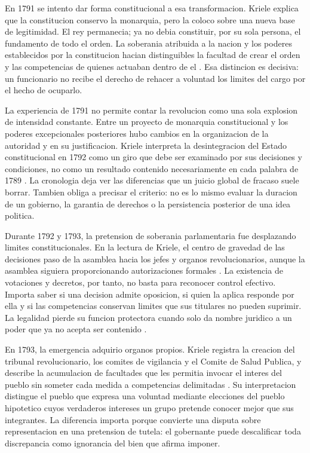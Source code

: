 \documentclass[spanish,letterpaper,oneside]{article}
\begin{document}
En 1791 se intento dar forma constitucional a esa transformacion.
Kriele explica que la constitucion conservo la monarquia, pero la
coloco sobre una nueva base de legitimidad. El rey permanecia; ya no
debia constituir, por su sola persona, el fundamento de todo el orden.
La soberania atribuida a la nacion y los poderes establecidos por la
constitucion hacian distinguibles la facultad de crear el orden y las
competencias de quienes actuaban dentro de el
\citep[secs.~68--69, pp.~266--272]{kriele2022}. Esa distincion es
decisiva: un funcionario no recibe el derecho de rehacer a voluntad
los limites del cargo por el hecho de ocuparlo.

La experiencia de 1791 no permite contar la revolucion como una sola
explosion de intensidad constante. Entre un proyecto de monarquia
constitucional y los poderes excepcionales posteriores hubo cambios
en la organizacion de la autoridad y en su justificacion. Kriele
interpreta la desintegracion del Estado constitucional en 1792 como
un giro que debe ser examinado por sus decisiones y condiciones,
no como un resultado contenido necesariamente en cada palabra de
1789 \citep[sec.~70, pp.~273--276]{kriele2022}. La cronologia deja
ver las diferencias que un juicio global de fracaso suele borrar.
Tambien obliga a precisar el criterio: no es lo mismo evaluar la
duracion de un gobierno, la garantia de derechos o la persistencia
posterior de una idea politica.

Durante 1792 y 1793, la pretension de soberania parlamentaria fue
desplazando limites constitucionales. En la lectura de Kriele, el
centro de gravedad de las decisiones paso de la asamblea hacia los
jefes y organos revolucionarios, aunque la asamblea siguiera
proporcionando autorizaciones formales \citep[sec.~71,
pp.~277--279]{kriele2022}. La existencia de votaciones y decretos,
por tanto, no basta para reconocer control efectivo. Importa saber
si una decision admite oposicion, si quien la aplica responde por
ella y si las competencias conservan limites que sus titulares no
pueden suprimir. La legalidad pierde su funcion protectora cuando
solo da nombre juridico a un poder que ya no acepta ser contenido
\citep{garciaRicci2011}.

En 1793, la emergencia adquirio organos propios. Kriele registra la
creacion del tribunal revolucionario, los comites de vigilancia y el
Comite de Salud Publica, y describe la acumulacion de facultades que
les permitia invocar el interes del pueblo sin someter cada medida
a competencias delimitadas \citep[pp.~280--283]{kriele2022}. Su
interpretacion distingue el pueblo que expresa una voluntad mediante
elecciones del pueblo hipotetico cuyos verdaderos intereses un grupo
pretende conocer mejor que sus integrantes. La diferencia importa
porque convierte una disputa sobre representacion en una pretension
de tutela: el gobernante puede descalificar toda discrepancia como
ignorancia del bien que afirma imponer.
\end{document}
